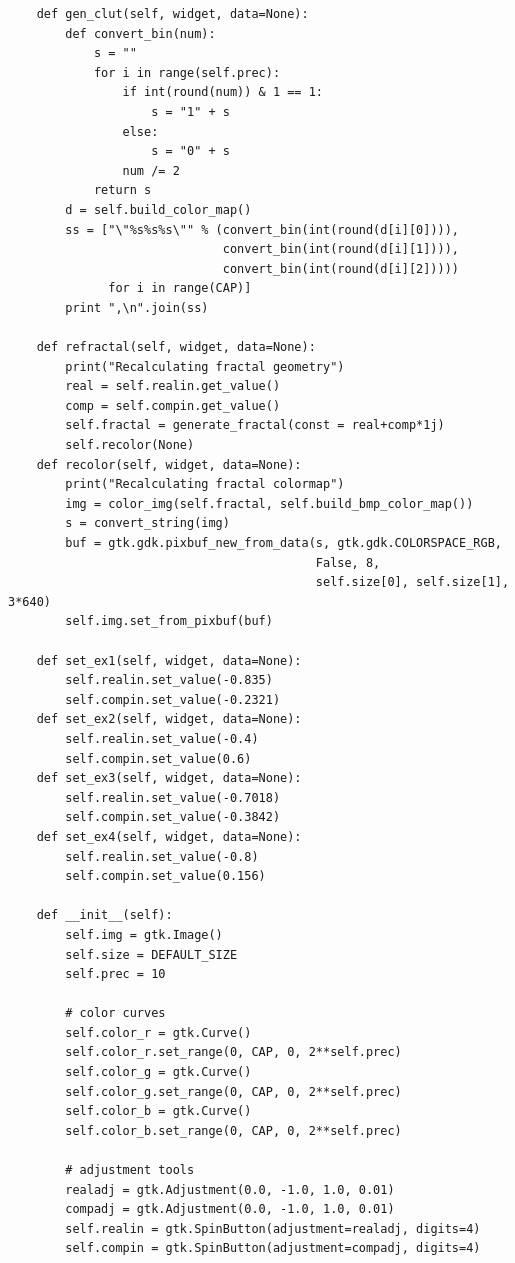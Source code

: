 \documentclass{article}
\begin{document}
\begin{lstlisting}
    def gen_clut(self, widget, data=None):
        def convert_bin(num):
            s = ""
            for i in range(self.prec):
                if int(round(num)) & 1 == 1:
                    s = "1" + s
                else:
                    s = "0" + s
                num /= 2
            return s
        d = self.build_color_map()
        ss = ["\"%s%s%s\"" % (convert_bin(int(round(d[i][0]))),
                              convert_bin(int(round(d[i][1]))),
                              convert_bin(int(round(d[i][2]))))
              for i in range(CAP)]
        print ",\n".join(ss)

    def refractal(self, widget, data=None):
        print("Recalculating fractal geometry")
        real = self.realin.get_value()
        comp = self.compin.get_value()
        self.fractal = generate_fractal(const = real+comp*1j)
        self.recolor(None)
    def recolor(self, widget, data=None):
        print("Recalculating fractal colormap")
        img = color_img(self.fractal, self.build_bmp_color_map())
        s = convert_string(img)
        buf = gtk.gdk.pixbuf_new_from_data(s, gtk.gdk.COLORSPACE_RGB,
                                           False, 8,
                                           self.size[0], self.size[1], 3*640)
        self.img.set_from_pixbuf(buf)

    def set_ex1(self, widget, data=None):
        self.realin.set_value(-0.835)
        self.compin.set_value(-0.2321)
    def set_ex2(self, widget, data=None):
        self.realin.set_value(-0.4)
        self.compin.set_value(0.6)
    def set_ex3(self, widget, data=None):
        self.realin.set_value(-0.7018)
        self.compin.set_value(-0.3842)
    def set_ex4(self, widget, data=None):
        self.realin.set_value(-0.8)
        self.compin.set_value(0.156)

    def __init__(self):
        self.img = gtk.Image()
        self.size = DEFAULT_SIZE
        self.prec = 10

        # color curves
        self.color_r = gtk.Curve()
        self.color_r.set_range(0, CAP, 0, 2**self.prec)
        self.color_g = gtk.Curve()
        self.color_g.set_range(0, CAP, 0, 2**self.prec)
        self.color_b = gtk.Curve()
        self.color_b.set_range(0, CAP, 0, 2**self.prec)

        # adjustment tools
        realadj = gtk.Adjustment(0.0, -1.0, 1.0, 0.01)
        compadj = gtk.Adjustment(0.0, -1.0, 1.0, 0.01)
        self.realin = gtk.SpinButton(adjustment=realadj, digits=4)
        self.compin = gtk.SpinButton(adjustment=compadj, digits=4)


\end{lstlisting}
\end{document}
